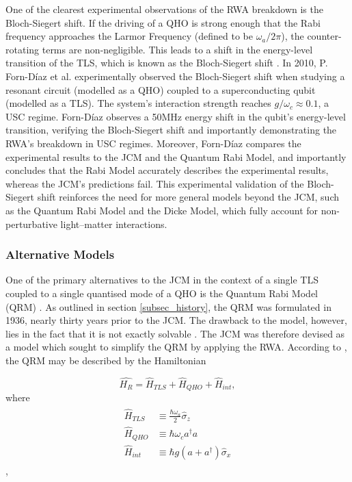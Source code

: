 \documentclass[12pt,a4paper]{article}
\begin{document}
One of the clearest experimental observations of the RWA breakdown is the Bloch-Siegert shift. If the driving of a QHO is strong enough that the Rabi frequency approaches the Larmor Frequency (defined to be $\omega_a/2\pi$), the counter-rotating terms are non-negligible. This leads to a shift in the energy-level transition of the TLS, which is known as the Bloch-Siegert shift \cite{Context2010-Bloch_Siegert}. In 2010, P. Forn-D\'iaz et al. experimentally observed the Bloch-Siegert shift when studying a resonant circuit (modelled as a QHO) coupled to a superconducting qubit (modelled as a TLS). The system's interaction strength reaches $g/\omega_c \approx 0.1$, a USC regime. Forn-D\'iaz observes a 50MHz energy shift in the qubit's energy-level transition, verifying the Bloch-Siegert shift and importantly demonstrating the RWA's breakdown in USC regimes. Moreover, Forn-D\'iaz compares the experimental results to the JCM and the Quantum Rabi Model, and importantly concludes that the Rabi Model accurately describes the experimental results, whereas the JCM's predictions fail. This experimental validation of the Bloch-Siegert shift reinforces the need for more general models beyond the JCM, such as the Quantum Rabi Model and the Dicke Model, which fully account for non-perturbative light–matter interactions.


\subsubsection{Alternative Models}

One of the primary alternatives to the JCM in the context of a single TLS coupled to a single quantised mode of a QHO is the Quantum Rabi Model (QRM) \cite{Context1936-Rabi}. As outlined in section \ref{subsec_history}, the QRM was formulated in 1936, nearly thirty years prior to the JCM. The drawback to the model, however, lies in the fact that it is not exactly solvable \cite{Hamiltonian2017-Rabi}. The JCM was therefore devised as a model which sought to simplify the QRM by applying the RWA. According to \cite{General2024-JCM_relevance}, the QRM may be described by the Hamiltonian

\begin{equation}
    \hat{H_R} = \hat{H}_{TLS} + \hat{H}_{QHO} + \hat{H}_{int}, 
\end{equation} \label{JC_H}
where 
\begin{align*}
    \begin{aligned}
        \hat{H}_{TLS} &\equiv \frac{\hbar\omega_a}{2}\hat{\sigma}_z \\
        \hat{H}_{QHO} &\equiv \hbar\omega_ca^\dagger a \\
        \hat{H}_{int} &\equiv \hbar g(a + a^\dagger)\hat{\sigma}_{x}
    \end{aligned}
\end{align*},
\end{document}
